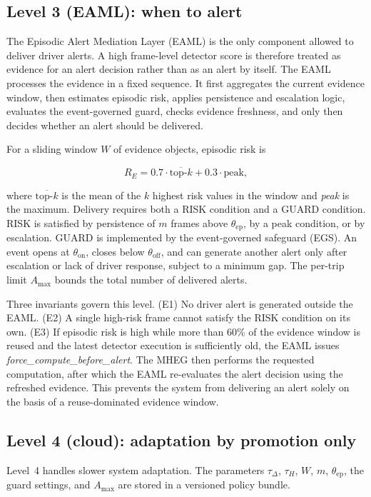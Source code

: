 \documentclass[conference]{IEEEtran}
\begin{document}
\subsection{Level 3 (EAML): when to alert}

The Episodic Alert Mediation Layer (EAML) is the only component allowed
to deliver driver alerts. A high frame-level detector score is therefore
treated as evidence for an alert decision rather than as an alert by
itself. The EAML processes the evidence in a fixed sequence. It first
aggregates the current evidence window, then estimates episodic risk,
applies persistence and escalation logic, evaluates the event-governed
guard, checks evidence freshness, and only then decides whether an alert
should be delivered.

For a sliding window $W$ of evidence objects, episodic risk is

\[
R_E = 0.7\cdot\overline{\text{top-}k}
      + 0.3\cdot\text{peak},
\]

where $\overline{\text{top-}k}$ is the mean of the $k$ highest risk
values in the window and \textit{peak} is the maximum. Delivery requires
both a RISK condition and a GUARD condition. RISK is satisfied by
persistence of $m$ frames above $\theta_{\mathrm{ep}}$, by a peak
condition, or by escalation. GUARD is implemented by the
event-governed safeguard (EGS). An event opens at
$\theta_{\mathrm{on}}$, closes below $\theta_{\mathrm{off}}$, and can
generate another alert only after escalation or lack of driver response,
subject to a minimum gap. The per-trip limit $A_{\max}$ bounds the total
number of delivered alerts.

Three invariants govern this level. (E1) No driver alert is generated
outside the EAML. (E2) A single high-risk frame cannot satisfy the RISK
condition on its own. (E3) If episodic risk is high while more than
60\% of the evidence window is reused and the latest detector execution
is sufficiently old, the EAML issues
\emph{force\_compute\_before\_alert}. The MHEG then performs the requested
computation, after which the EAML re-evaluates the alert decision using
the refreshed evidence. This prevents the system from delivering an alert
solely on the basis of a reuse-dominated evidence window.

\subsection{Level 4 (cloud): adaptation by promotion only}

Level~4 handles slower system adaptation. The parameters
$\tau_\Delta$, $\tau_H$, $W$, $m$, $\theta_{\mathrm{ep}}$, the guard
settings, and $A_{\max}$ are stored in a versioned policy bundle.
\end{document}
